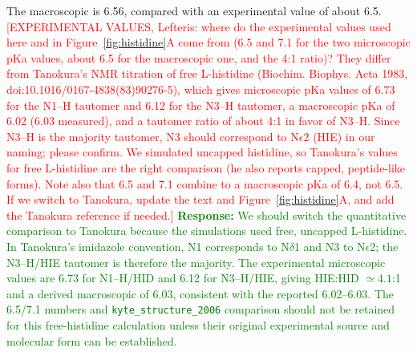 The macroscopic \pka{} is 6.56, compared with an experimental value of about 6.5. \textcolor{red}{[EXPERIMENTAL VALUES, Lefteris: where do the experimental values used here and in Figure~\ref{fig:histidine}A come from (6.5 and 7.1 for the two microscopic pKa values, about 6.5 for the macroscopic one, and the 4:1 ratio)?
They differ from Tanokura's NMR titration of free L-histidine (Biochim.
Biophys.
Acta 1983, doi:10.1016/0167-4838(83)90276-5), which gives microscopic pKa values of 6.73 for the N1--H tautomer and 6.12 for the N3--H tautomer, a macroscopic pKa of 6.02 (6.03 measured), and a tautomer ratio of about 4:1 in favor of N3--H.
Since N3--H is the majority tautomer, N3 should correspond to N$\epsilon$2 (HIE) in our naming; please confirm.
We simulated uncapped histidine, so Tanokura's values for free L-histidine are the right comparison (he also reports capped, peptide-like forms).
Note also that 6.5 and 7.1 combine to a macroscopic pKa of 6.4, not 6.5.
If we switch to Tanokura, update the text and Figure~\ref{fig:histidine}A, and add the Tanokura reference if needed.]}
\textcolor{green}{\textbf{Response:} We should switch the quantitative comparison to Tanokura because the simulations used free, uncapped L-histidine. In Tanokura's imidazole convention, N1 corresponds to N$\delta$1 and N3 to N$\epsilon$2; the N3--H/HIE tautomer is therefore the majority. The experimental microscopic values are 6.73 for N1--H/HID and 6.12 for N3--H/HIE, giving HIE:HID $\simeq4.1$:1 and a derived macroscopic \pka{} of 6.03, consistent with the reported 6.02--6.03. The 6.5/7.1 numbers and \texttt{kyte\_structure\_2006} comparison should not be retained for this free-histidine calculation unless their original experimental source and molecular form can be established.}

